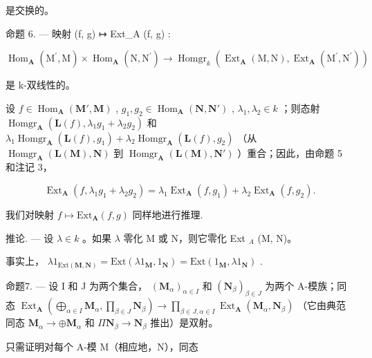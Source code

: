 是交换的。

命题 6. --- 映射 (f, g) ↦ Ext\_A (f, g) :

\[
\operatorname{Hom} _ {\mathbf {A}} \left(\mathrm{M} ^ {\prime}, \mathrm{M}\right) \times \operatorname{Hom} _ {\mathbf {A}} \left(\mathrm{N}, \mathrm{N} ^ {\prime}\right)\rightarrow \operatorname{Homgr} _ {k} \left(\operatorname{Ext} _ {\mathbf {A}} (\mathrm{M}, \mathrm{N}), \operatorname{Ext} _ {\mathbf {A}} \left(\mathrm{M} ^ {\prime}, \mathrm{N} ^ {\prime}\right)\right)
\]

是 k-双线性的。

设 \(f \in \operatorname{Hom}_{\mathbf{A}}(\mathbf{M}', \mathbf{M})\) , \(g_1, g_2 \in \operatorname{Hom}_{\mathbf{A}}(\mathbf{N}, \mathbf{N}')\) , \(\lambda_1, \lambda_2 \in k\) ；则态射 \(\operatorname{Homgr}_{\mathbf{A}}(\mathbf{L}(f), \lambda_1 g_1 + \lambda_2 g_2)\) 和 \(\lambda_1 \operatorname{Homgr}_{\mathbf{A}}(\mathbf{L}(f), g_1) + \lambda_2 \operatorname{Homgr}_{\mathbf{A}}(\mathbf{L}(f), g_2)\) （从 \(\operatorname{Homgr}_{\mathbf{A}}(\mathbf{L}(\mathbf{M}), \mathbf{N})\) 到 \(\operatorname{Homgr}_{\mathbf{A}}(\mathbf{L}(\mathbf{M}), \mathbf{N}')\) ）重合；因此，由命题 5 和注记 3，

\[
\operatorname{Ext} _ {\mathbf {A}} \left(f, \lambda_ {1} g _ {1} + \lambda_ {2} g _ {2}\right) = \lambda_ {1} \operatorname{Ext} _ {\mathbf {A}} \left(f, g _ {1}\right) + \lambda_ {2} \operatorname{Ext} _ {\mathbf {A}} \left(f, g _ {2}\right).\tag{10}
\]

我们对映射 \(f\mapsto\mathrm{Ext}_{\mathbf{A}}(f,g)\) 同样地进行推理.

推论. --- 设 \(\lambda \in k\) 。如果 \(\lambda\) 零化 M 或 N，则它零化 Ext \(_{A}\) (M, N)。

事实上， \(\lambda 1_{\mathrm{Ext}(\mathbf{M},\mathbf{N})} = \mathrm{Ext}(\lambda 1_{\mathbf{M}},1_{\mathbf{N}}) = \mathrm{Ext}(1_{\mathbf{M}},\lambda 1_{\mathbf{N}})\) .

命题7. --- 设 I 和 J 为两个集合， \((\mathbf{M}_{\alpha})_{\alpha \in I}\) 和 \((\mathbf{N}_{\beta})_{\beta \in J}\) 为两个 A-模族；同态 \(\operatorname{Ext}_{\mathbf{A}}\left(\bigoplus_{\alpha \in I} \mathbf{M}_{\alpha}, \prod_{\beta \in J} \mathbf{N}_{\beta}\right) \to \prod_{\beta \in J, \alpha \in I} \operatorname{Ext}_{\mathbf{A}}(\mathbf{M}_{\alpha}, \mathbf{N}_{\beta})\) （它由典范同态 \(\mathbf{M}_{\alpha} \to \oplus \mathbf{M}_{\alpha}\) 和 \(\Pi \mathbf{N}_{\beta} \to \mathbf{N}_{\beta}\) 推出）是双射。

只需证明对每个 A-模 M（相应地，N），同态

